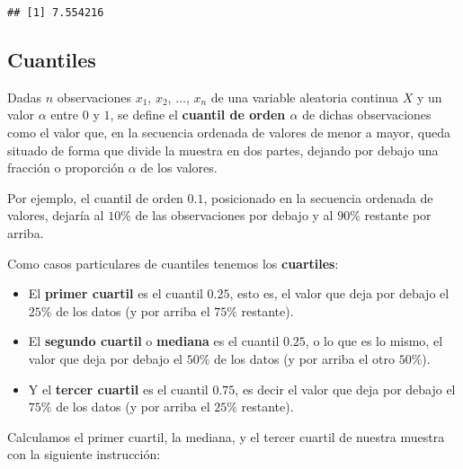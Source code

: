 \documentclass[
  degree=mecinf,
  title=normal,
  toc=normal,
  bib=normal]{mnye}
\newenvironment{Shaded}{\begin{snugshade}}{\end{snugshade}}
\newcommand{\AttributeTok}[1]{\textcolor[rgb]{0.77,0.63,0.00}{#1}}
\newcommand{\FloatTok}[1]{\textcolor[rgb]{0.00,0.00,0.81}{#1}}
\newcommand{\FunctionTok}[1]{\textcolor[rgb]{0.00,0.00,0.00}{#1}}
\newcommand{\NormalTok}[1]{#1}
\newcommand{\SpecialCharTok}[1]{\textcolor[rgb]{0.00,0.00,0.00}{#1}}
\begin{document}
\begin{Shaded}
\end{Shaded}

\begin{verbatim}
## [1] 7.554216
\end{verbatim}

\hypertarget{quantiles}{%
\subsection{Cuantiles}\label{quantiles}}

Dadas \(n\) observaciones \(x_1\), \(x_2\), \(\dots\), \(x_n\) de una variable aleatoria continua \(X\) y un valor \(\alpha\) entre \(0\) y \(1\), se define el \textbf{cuantil de orden \(\alpha\)} de dichas observaciones como el valor que, en la secuencia ordenada de valores de menor a mayor, queda situado de forma que divide la muestra en dos partes, dejando por debajo una fracción o proporción \(\alpha\) de los valores.

Por ejemplo, el cuantil de orden \(0.1\), posicionado en la secuencia ordenada de valores, dejaría al \(10\%\) de las observaciones por debajo y al \(90\%\) restante por arriba.

Como casos particulares de cuantiles tenemos los \textbf{cuartiles}:

\begin{itemize}
\item
  El \textbf{primer cuartil} es el cuantil \(0.25\), esto es, el valor que deja por debajo el \(25\%\) de los datos (y por arriba el \(75\%\) restante).
\item
  El \textbf{segundo cuartil} o \textbf{mediana} es el cuantil \(0.25\), o lo que es lo mismo, el valor que deja por debajo el \(50\%\) de los datos (y por arriba el otro \(50\%\)).
\item
  Y el \textbf{tercer cuartil} es el cuantil \(0.75\), es decir el valor que deja por debajo el \(75\%\) de los datos (y por arriba el \(25\%\) restante).
\end{itemize}

Calculamos el primer cuartil, la mediana, y el tercer cuartil de nuestra muestra con la siguiente instrucción:

\begin{Shaded}
\end{Shaded}
\end{document}
